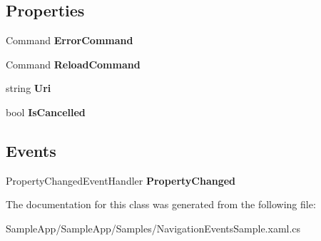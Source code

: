 \subsection*{Properties}
\begin{DoxyCompactItemize}
\item 
\mbox{\label{class_sample_app_1_1_samples_1_1_navigation_events_sample_1_1_navigation_events_view_model_a836de36f740a9684ac28ad47e3b864e2}} 
Command {\bfseries Error\+Command}
\item 
\mbox{\label{class_sample_app_1_1_samples_1_1_navigation_events_sample_1_1_navigation_events_view_model_aa5d4586e05e7d7a686e38fd12de05a99}} 
Command {\bfseries Reload\+Command}
\item 
\mbox{\label{class_sample_app_1_1_samples_1_1_navigation_events_sample_1_1_navigation_events_view_model_a818ed2e968408d1432016d3a353de89b}} 
string {\bfseries Uri}
\item 
\mbox{\label{class_sample_app_1_1_samples_1_1_navigation_events_sample_1_1_navigation_events_view_model_a42bbb085cdf27f8ef2cfb07b2168c5ae}} 
bool {\bfseries Is\+Cancelled}
\end{DoxyCompactItemize}
\subsection*{Events}
\begin{DoxyCompactItemize}
\item 
\mbox{\label{class_sample_app_1_1_samples_1_1_navigation_events_sample_1_1_navigation_events_view_model_a991db46f1941335a5c94577322fd160d}} 
Property\+Changed\+Event\+Handler {\bfseries Property\+Changed}
\end{DoxyCompactItemize}


The documentation for this class was generated from the following file\+:\begin{DoxyCompactItemize}
\item 
Sample\+App/\+Sample\+App/\+Samples/Navigation\+Events\+Sample.\+xaml.\+cs\end{DoxyCompactItemize}
